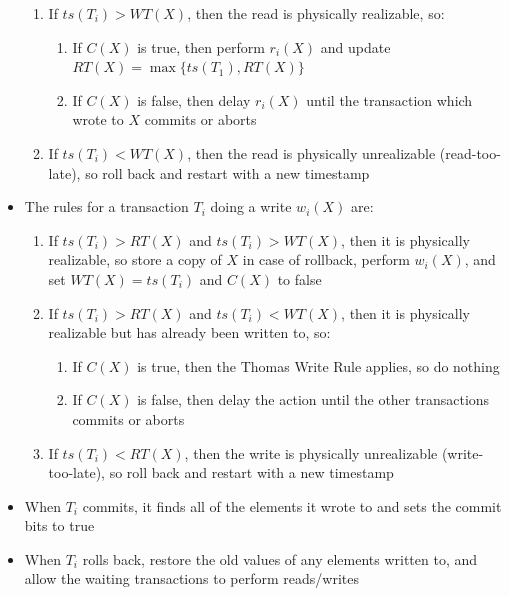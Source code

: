 \documentclass[a4paper]{article}
\begin{document}
\begin{itemize}
\begin{enumerate}
\item If $ts(T_i)>WT(X)$, then the read is physically realizable, so:
\begin{enumerate}[label=(\roman*)]
\item If $C(X)$ is true, then perform $r_i(X)$ and update $RT(X)=\max\{ts(T_1),RT(X)\}$
\item If $C(X)$ is false, then delay $r_i(X)$ until the transaction which wrote to $X$ commits or aborts
\end{enumerate}
\item If $ts(T_i)<WT(X)$, then the read is physically unrealizable (read-too-late), so roll back and restart with a new timestamp
\end{enumerate}
\item The rules for a transaction $T_i$ doing a write $w_i(X)$ are:
\begin{enumerate}
\item If $ts(T_i)>RT(X)$ and $ts(T_i)>WT(X)$, then it is physically realizable, so store a copy of $X$ in case of rollback, perform $w_i(X)$, and set $WT(X)=ts(T_i)$ and $C(X)$ to false
\item If $ts(T_i)>RT(X)$ and $ts(T_i)<WT(X)$, then it is physically realizable but has already been written to, so:
\begin{enumerate}[label=(\roman*)]
\item If $C(X)$ is true, then the Thomas Write Rule applies, so do nothing
\item If $C(X)$ is false, then delay the action until the other transactions commits or aborts
\end{enumerate}
\item If $ts(T_i)<RT(X)$, then the write is physically unrealizable (write-too-late), so roll back and restart with a new timestamp
\end{enumerate}
\item When $T_i$ commits, it finds all of the elements it wrote to and sets the commit bits to true
\item When $T_i$ rolls back, restore the old values of any elements written to, and allow the waiting transactions to perform reads/writes
\end{itemize}
\end{document}
